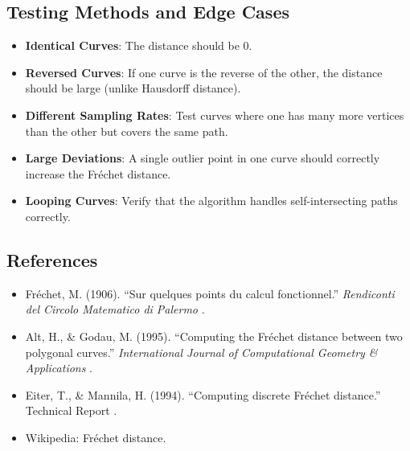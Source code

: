 \subsection{Testing Methods and Edge Cases}
\begin{itemize}
  \item \textbf{Identical Curves}: The distance should be 0.
  \item \textbf{Reversed Curves}: If one curve is the reverse of the other, the distance should be large (unlike Hausdorff distance).
  \item \textbf{Different Sampling Rates}: Test curves where one has many more vertices than the other but covers the same path.
  \item \textbf{Large Deviations}: A single outlier point in one curve should correctly increase the Fr\'{e}chet distance.
  \item \textbf{Looping Curves}: Verify that the algorithm handles self-intersecting paths correctly.
\end{itemize}

\subsection{References}
\begin{itemize}
  \item Fr\'{e}chet, M. (1906). ``Sur quelques points du calcul fonctionnel.'' \textit{Rendiconti del Circolo Matematico di Palermo} \cite{frechet1906}.
  \item Alt, H., \& Godau, M. (1995). ``Computing the Fr\'{e}chet distance between two polygonal curves.'' \textit{International Journal of Computational Geometry \& Applications} \cite{alt1995}.
  \item Eiter, T., \& Mannila, H. (1994). ``Computing discrete Fr\'{e}chet distance.'' Technical Report \cite{eiter1994}.
  \item Wikipedia: Fr\'{e}chet distance.
\end{itemize}

